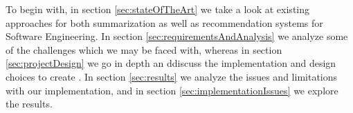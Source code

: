 To begin with, in section \ref{sec:stateOfTheArt} we take a look at existing approaches for both summarization as well as recommendation systems for Software Engineering. In section \ref{sec:requirementsAndAnalysis} we analyze some of the challenges which we may be faced with, whereas in section \ref{sec:projectDesign} we go in depth an ddiscuss the implementation and design choices to create \projectName. In section \ref{sec:results} we analyze the issues and limitations with our implementation, and in section \ref{sec:implementationIssues} we explore the results.

